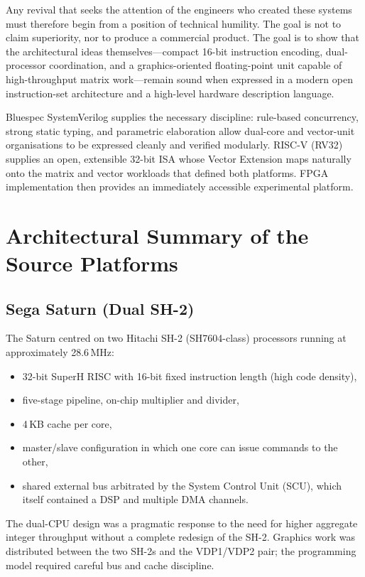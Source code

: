 \documentclass[11pt,a4paper]{article}
\begin{document}
Any revival that seeks the attention of the engineers who created these systems must therefore begin from a position of technical humility. The goal is not to claim superiority, nor to produce a commercial product. The goal is to show that the architectural ideas themselves---compact 16-bit instruction encoding, dual-processor coordination, and a graphics-oriented floating-point unit capable of high-throughput matrix work---remain sound when expressed in a modern open instruction-set architecture and a high-level hardware description language.

Bluespec SystemVerilog supplies the necessary discipline: rule-based concurrency, strong static typing, and parametric elaboration allow dual-core and vector-unit organisations to be expressed cleanly and verified modularly. RISC-V (RV32) supplies an open, extensible 32-bit ISA whose Vector Extension maps naturally onto the matrix and vector workloads that defined both platforms. FPGA implementation then provides an immediately accessible experimental platform.

\section{Architectural Summary of the Source Platforms}

\subsection{Sega Saturn (Dual SH-2)}

The Saturn centred on two Hitachi SH-2 (SH7604-class) processors running at approximately 28.6\,MHz:
\begin{itemize}[leftmargin=1.5em]
  \item 32-bit SuperH RISC with 16-bit fixed instruction length (high code density),
  \item five-stage pipeline, on-chip multiplier and divider,
  \item 4\,KB cache per core,
  \item master/slave configuration in which one core can issue commands to the other,
  \item shared external bus arbitrated by the System Control Unit (SCU), which itself contained a DSP and multiple DMA channels.
\end{itemize}
The dual-CPU design was a pragmatic response to the need for higher aggregate integer throughput without a complete redesign of the SH-2. Graphics work was distributed between the two SH-2s and the VDP1/VDP2 pair; the programming model required careful bus and cache discipline.
\end{document}
